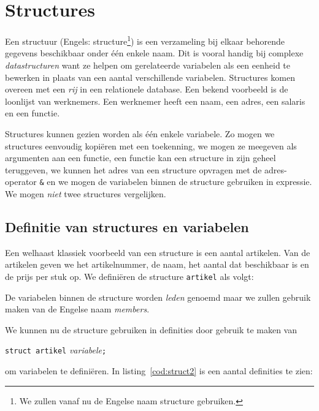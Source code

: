 \chapter{Structures}
\label{cha:structures}
\thispagestyle{empty}

Een structuur (Engels: structure\footnote{We zullen vanaf nu de Engelse naam structure gebruiken.}) is een verzameling bij elkaar behorende gegevens beschikbaar onder één enkele naam. Dit is vooral handig bij complexe \textsl{datastructuren} want ze helpen om gerelateerde variabelen als een eenheid te bewerken in plaats van een aantal verschillende variabelen. Structures komen overeen met een \textsl{rij} in een relationele database. Een bekend voorbeeld is de loonlijst van werknemers. Een werknemer heeft een naam, een adres, een salaris en een functie.

Structures kunnen gezien worden als één enkele variabele. Zo mogen we structures eenvoudig kopiëren met een toekenning, we mogen ze meegeven als argumenten aan een functie, een functie kan een structure in zijn geheel teruggeven, we kunnen het adres van een structure opvragen met de adres-operator \texttt{\&} en we mogen de variabelen binnen de structure gebruiken in expressie. We mogen \textsl{niet} twee structures vergelijken.

\section{Definitie van structures en variabelen}
Een welhaast klassiek voorbeeld van een structure is een aantal artikelen. Van de artikelen geven we het artikelnummer, de naam, het aantal dat beschikbaar is en de prijs per stuk op. We definiëren de structure \texttt{artikel} als volgt:


De variabelen binnen de structure worden \textsl{leden} genoemd maar we zullen gebruik maken van de Engelse naam \textsl{members}.

We kunnen nu de structure gebruiken in definities door gebruik te maken van

\hspace*{1em}\texttt{struct artikel} \textsl{variabele}\texttt{;}

om variabelen te definiëren. In listing~\ref{cod:struct2} is een aantal definities te zien:

